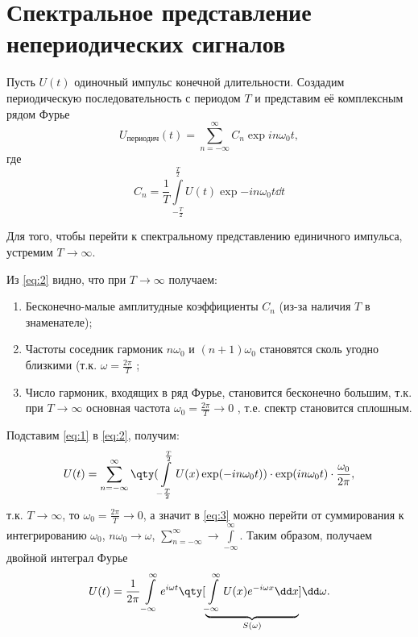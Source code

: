 \documentclass[a4paper,14pt]{extarticle}
\begin{document}
\section{Спектральное представление непериодических сигналов}%
Пусть $U(t)$ одиночный импульс конечной длительности. Создадим периодическую
последовательность с периодом $T$ и представим её комплексным рядом Фурье
\begin{equation}
    \label{eq:1}
    U_{\text{периодич} } (t) = \sum\limits_{n=-\infty}^{\infty} C_n \exp{ i n \omega_0 t},
\end{equation}
где 
\begin{equation}
    \label{eq:2}
    C_n =\frac{1}{T} \int\limits_{- \frac{T}{2}}^{\frac{T}{2}} U(t) \exp{-in\omega_{0}t } \dd t
\end{equation}

Для того, чтобы перейти к спектральному представлению единичного импульса,
устремим $T \to  \infty$.

Из \eqref{eq:2} видно, что при $T \to \infty$ получаем:
\begin{enumerate}
    \item Бесконечно-малые амплитудные коэффициенты $C_n$ (из-за наличия $T$ 
        в знаменателе);
    \item Частоты соседник гармоник $n \omega_{0}$ и $(n+1) \omega_{0}$ 
        становятся  сколь угодно близкими (т.к. $\omega=\frac{2\pi}{T}$ ;
    \item Число гармоник, входящих в ряд Фурье, становится бесконечно большим, т.к. при $T \to \infty$ основная частота $\omega_{0} = \frac{2 \pi}{T} \to 0$ ,
        т.е. спектр становится сплошным.
\end{enumerate}
Подставим \eqref{eq:1}  в \eqref{eq:2}, получим: 
\begin{equation}
    \label{eq:3}
    U(t) = \sum\limits_{n=-\infty}^{\infty} 
    \qty( 
    \int\limits_{- \frac{T}{2}}^{\frac{T}{2}} U(x) \exp(-in \omega_{0} t)
        )  
        \cdot \exp(in\omega_{0} t) \cdot \frac{\omega_{0}}{2 \pi},
\end{equation}
т.к. $T \to \infty $, то  $\omega_{0} = \frac{2\pi}{T} \to 0$, 
а значит в \eqref{eq:3}  можно перейти от суммирования к интегрированию 
$\omega_{0}$, $n \omega_{0} \to \omega$, 
$\sum\limits_{n=-\infty}^{\infty} \to \int\limits_{-\infty}^{\infty}  $. 
Таким образом, получаем двойной интеграл Фурье
\begin{equation}
    \label{eq:5}
    U(t) = \frac{1}{2 \pi} \int\limits_{-\infty}^{\infty} e^{i \omega t} 
    \qty[ 
    \underbrace{ 
    \int\limits_{-\infty}^{\infty} U(x) e^{- i \omega x} \dd x
}_{S(\omega)}
        ] \dd \omega.
\end{equation}
\end{document}
